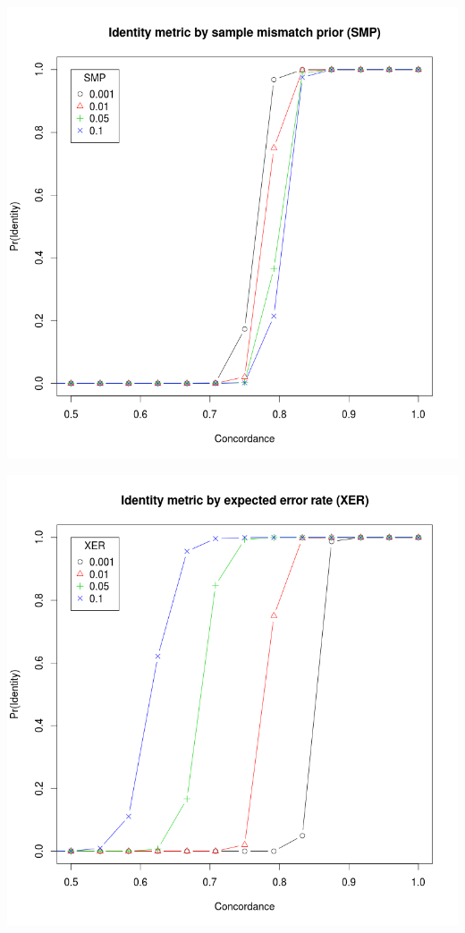 \documentclass{article}
\begin{document}
\includegraphics[scale=0.5]{identity_by_smp}

\includegraphics[scale=0.5]{identity_by_xer}
\end{document}
